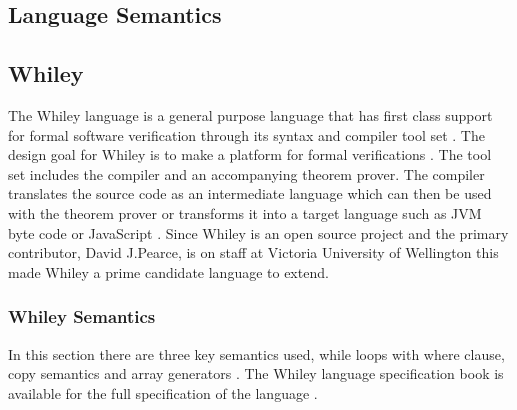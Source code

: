 \subsection{Language Semantics}

\subsection{Whiley}

The Whiley language is a general purpose language that has first class
support for formal software verification through its syntax and compiler
tool set \cite{whiley-origin}.
The design goal for Whiley is to make a platform for formal verifications \cite{whiley-origin}.
The tool set includes the compiler and an accompanying theorem prover.
The compiler translates the source code as an intermediate language which
can then be used with the theorem prover or transforms it into a target
language such as JVM byte code or JavaScript \cite{whiley-design}
\cite{wyil}.
Since Whiley is an open source project and the primary contributor, David
J.Pearce, is on staff at Victoria University of Wellington this made Whiley a
prime candidate language to extend.


\subsubsection{Whiley Semantics}

In this section there are three key semantics used, while loops with where
clause, copy semantics and array generators \cite{whiley-design}.
The Whiley language specification book is available for the full
specification of the language \cite{whiley-spec}.

